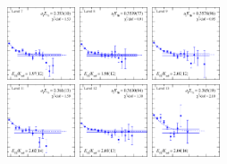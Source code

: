 \begin{figure}[H]
    \includegraphics[width=0.18\textwidth]{figures/sigmas/hu/fits/fit_9.pdf}
    \includegraphics[width=0.18\textwidth]{figures/sigmas/hu/fits/fit_6.pdf}
    \includegraphics[width=0.18\textwidth]{figures/sigmas/hu/fits/fit_12.pdf}\\
    \includegraphics[width=0.18\textwidth]{figures/sigmas/hu/fits/fit_11.pdf}
    \includegraphics[width=0.18\textwidth]{figures/sigmas/hu/fits/fit_7.pdf}
    \includegraphics[width=0.18\textwidth]{figures/sigmas/hu/fits/fit_23.pdf}

\end{figure}
